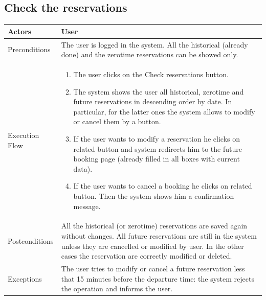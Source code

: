 \subsection{Check the reservations}
\begin{tabular}{lp{8cm}}
	\hline 
	Actors & User \\ \hline
	Preconditions & The user is logged in the system.
All the historical (already done) and the zerotime \glspl{reservation} can be showed only. \\ \hline
	Execution Flow & \begin{enumerate}
					\item The user clicks on the Check \glspl{reservation} button.			
					\item The system shows the user all historical, zerotime and \gls{future} \glspl{reservation} in descending order by date. In particular, for the latter ones the system allows to modify or cancel them by a button.
					\item If the user wants to modify a \gls{reservation} he clicks on related button and system redirects him to the \gls{future} booking page (already filled in all boxes with current data).
					\item If the user wants to cancel a booking he clicks on related button. Then the system shows him a confirmation message.
				\end{enumerate}
	 \\ \hline
	 Postconditions & All the historical (or zerotime) \glspl{reservation} are saved again without changes. All \gls{future} \glspl{reservation} are still in the system unless they are cancelled or modified by user. In the other cases the \gls{reservation} are correctly modified or deleted.\\ \hline
	 Exceptions & The user tries to modify or cancel a \gls{future} \gls{reservation} less that 15 minutes before the departure time: the system rejects the operation and informs the user.  \\ \hline
\end{tabular}

\clearpage

